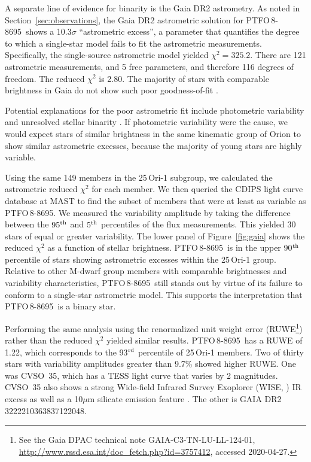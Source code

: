 \documentclass[12pt,twocolumn,tighten]{aastex62}
\newcommand{\ptfo}{PTFO$\,$8-8695}
\begin{document}
A separate line of evidence for binarity is the Gaia DR2 astrometry.
As noted in Section~\ref{sec:observations}, the Gaia DR2 astrometric
solution for \ptfo\ shows a 10.3$\sigma$ ``astrometric excess'', a
parameter that quantifies the degree to which a single-star model
fails to fit the astrometric measurements.  Specifically, the
single-source astrometric model yielded $\chi^2=325.2$.  There are 121
astrometric measurements, and 5 free parameters, and therefore 116
degrees of freedom. The reduced $\chi^2$ is 2.80.  The majority of
stars with comparable brightness in Gaia do not show such poor
goodness-of-fit \citep[see][Appendix A]{lindegren_gaiasoln_2018}.

Potential explanations for the poor astrometric fit include
photometric variability and unresolved stellar binarity \citep[{\it
e.g.},][]{rizzuto_ZEIT8_2018,belokurov_unresolved_2020}.  If
photometric variability were the cause, we would expect stars of
similar brightness in the same kinematic group of Orion to show
similar astrometric excesses, because the majority of young stars are
highly variable.

Using the same 149 members in the 25$\,$Ori-1 subgroup, we calculated
the astrometric reduced $\chi^2$ for each member.  We then queried the
CDIPS light curve database at MAST \citep{bouma_cluster_2019} to find
the subset of members that were at least as variable as \ptfo.  We
measured the variability amplitude by taking the difference between
the $95^{\rm th}$ and $5^{\rm th}$ percentiles of the flux
measurements.  This yielded 30 stars of equal or greater variability.
The lower panel of Figure~\ref{fig:gaia} shows the reduced $\chi^2$ as
a function of stellar brightness.  \ptfo\ is in the upper 90$^{\rm
th}$ percentile of stars showing astrometric excesses within the
25$\,$Ori-1 group.  Relative to other M-dwarf group members with
comparable brightnesses and variability characteristics, \ptfo\ still
stands out by virtue of its failure to conform to a single-star
astrometric model. This supports the interpretation that \ptfo\ is a
binary star.

Performing the same analysis using the renormalized unit weight error
(RUWE\footnote{ See the Gaia DPAC technical note
GAIA-C3-TN-LU-LL-124-01,
\url{http://www.rssd.esa.int/doc_fetch.php?id=3757412}, accessed
2020-04-27. }) rather than the reduced $\chi^2$ yielded similar
results.  \ptfo\ has a RUWE of 1{.}22, which corresponds to the
93$^{\rm rd}$ percentile of 25$\,$Ori-1 members.  Two of thirty stars
with variability amplitudes greater than 9.7\% showed higher RUWE.
One was CVSO~35, which has a TESS light curve that varies by 2
magnitudes.  CVSO~35 also shows a strong Wide-field Infrared Survey
Exoplorer (WISE, \citealt{wright_WISE_2010}) IR excess as well as a
10$\mu$m silicate emission feature \citep{mauco_herschel_2018}.  The
other is GAIA DR2 3222210363837122048.
\end{document}
